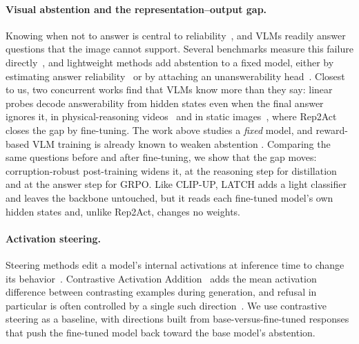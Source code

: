 \paragraph{Visual abstention and the representation--output gap.}
Knowing when not to answer is central to
reliability~\cite{geifman2017selective,kirichenko2025abstentionbench}, and VLMs readily
answer questions that the image cannot support. Several benchmarks measure this failure
directly~\cite{miyai2024upd,zhu2025mohobench,saadat2025visiontrap,madhusudhan2026knowing,
chandu2025certainly}, and lightweight methods add abstention to a fixed model, either by
estimating answer reliability~\cite{khan2024consistency,srinivasan2024recoverr} or by
attaching an unanswerability head~\cite{vardi2025clipup}. Closest to us, two concurrent
works find that VLMs know more than they say: linear probes decode answerability from
hidden states even when the final answer ignores it, in physical-reasoning
videos~\cite{pramono2026trapsbench} and in static images~\cite{he2026knowing}, where
Rep2Act closes the gap by fine-tuning. The work above studies a \emph{fixed} model, and
reward-based VLM training is already known to weaken abstention .
Comparing the same questions before and after fine-tuning, we show that the gap moves:
corruption-robust post-training widens it, at the reasoning step for distillation and at
the answer step for GRPO. Like CLIP-UP, LATCH adds a
light classifier and leaves the backbone untouched, but it reads each fine-tuned model's
own hidden states and, unlike Rep2Act, changes no weights.

\paragraph{Activation steering.}
Steering methods edit a model's internal activations at inference time to change its
behavior~\cite{turner2023actadd,li2023iti,zou2023repe}. Contrastive Activation
Addition~\cite{rimsky2024caa} adds the mean activation difference between contrasting
examples during generation, and refusal in particular is often controlled by a single such
direction~\cite{arditi2024refusal}. We use contrastive steering as a baseline, with
directions built from base-versus-fine-tuned responses that push the fine-tuned model back
toward the base model's abstention.
